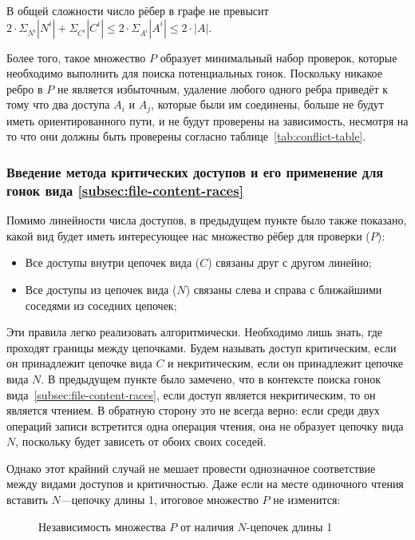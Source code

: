 В общей сложности число рёбер в графе не превысит $2 \cdot \Sigma_{N^i} |N^i| + \Sigma_{C^i} |C^i| \leq 2 \cdot \Sigma_{A^i} |A^i| \leq 2 \cdot |A|$.

Более того, такое множество $P$ образует минимальный набор проверок, которые необходимо выполнить для поиска потенциальных гонок. Поскольку никакое ребро в $P$ не является избыточным, удаление любого одного ребра приведёт к тому что два доступа $A_i$ и $A_j$, которые были им соединены, больше не будут иметь ориентированного пути, и не будут проверены на зависимость, несмотря на то что они должны быть проверены согласно таблице~\ref{tab:conflict-table}.

\subsubsection{Введение метода критических доступов и его применение для гонок вида \ref{subsec:file-content-races}}

Помимо линейности числа доступов, в предыдущем пункте было также показано, какой вид будет иметь интересующее нас множество рёбер для проверки ($P$):

\begin{itemize}
    \item Все доступы внутри цепочек вида ($C$) связаны друг с другом линейно;
    \item Все доступы из цепочек вида ($N$) связаны слева и справа с ближайшими соседями из соседних цепочек;
\end{itemize}

Эти правила легко реализовать алгоритмически. Необходимо лишь знать, где проходят границы между цепочками. Будем называть доступ критическим, если он принадлежит цепочке вида $C$ и некритическим, если он принадлежит цепочке вида $N$. В предыдущем пункте было замечено, что в контексте поиска гонок вида~\ref{subsec:file-content-races}, если доступ является некритическим, то он является чтением. В обратную сторону это не всегда верно: если среди двух операций записи встретится одна операция чтения, она не образует цепочку вида $N$, поскольку будет зависеть от обоих своих соседей.

Однако этот крайний случай не мешает провести однозначное соответствие между видами доступов и критичностью. Даже если на месте одиночного чтения вставить $N$---цепочку длины 1, итоговое множество $P$ не изменится:

\begin{figure}[H]
    \centering
    
    \caption{Независимость множества $P$ от наличия $N$-цепочек длины 1}
    \label{fig:short-n-chain}
\end{figure}

